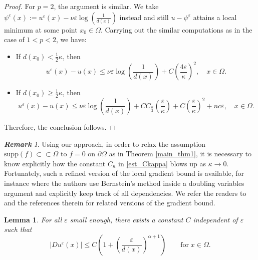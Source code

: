 \documentclass[12pt,reqno]{amsart}
\numberwithin{figure}{section}
\theoremstyle{plain}
\newtheorem{lem}[thm]{Lemma}
\theoremstyle{remark}
\newtheorem{rem}{\bf{Remark}}
\numberwithin{equation}{section}
\begin{document}
\begin{proof}
For $p = 2$, the argument is similar. We take $\psi^\varepsilon(x):=u^\varepsilon(x)-\nu \varepsilon \log \left(\frac{1}{d(x)}\right)$ instead and still $u-\psi^\varepsilon$ attains a local minimum at some point $x_0 \in \Omega$. Carrying out the similar computations as in the case of $1 < p < 2$, we have:
\begin{itemize}
    \item If $\displaystyle d(x_0) < \frac{1}{2} \kappa$, then
    \begin{equation*}
        u^\varepsilon(x)-u(x) \leq \nu \varepsilon \log \left( \frac{1}{d(x)} \right) + C\left( \frac{4\varepsilon}{\kappa}\right)^2, \quad x \in \Omega.
    \end{equation*}
    \item If $\displaystyle d(x_0) \geq \frac{1}{2} \kappa$, then
    \begin{equation*}
        u^\varepsilon(x)-u(x) \leq \nu \varepsilon \log\left(\frac{1}{d(x)}\right) + 
        C C_\frac{\kappa}{2} \left( \frac{\varepsilon}{\kappa} \right) + C \left( \frac{\varepsilon}{\kappa} \right)^2 + nc\varepsilon, \quad x \in \Omega.
    \end{equation*}
\end{itemize}
Therefore, the conclusion follows.
\end{proof}

\begin{rem} Using our approach, in order to relax the assumption $\mathrm{supp}(f)\subset\subset\Omega$ to $f = 0$ on $\partial\Omega$ as in Theorem \ref{main_thm1}, it is necessary to know explicitly how the constant $C_\kappa$ in \eqref{est_Ckappa} blows up as $\kappa\to 0$. Fortunately, such a refined version of the local gradient bound is available, for instance \cite[Theorem 3.1]{Armstrong2015} where the authors use Bernstein's method inside a doubling variables argument and explicitly keep track of all dependencies. We refer the readers to \cite{armstrong_stochastic_2012, barles_weak_1991,capuzzo_dolcetta_holder_2010} and the references therein for related versions of the gradient bound.
\end{rem}


\begin{lem}\label{lem:boundDu^eps} For all $\varepsilon$ small enough, there exists a constant $C$ independent of $\varepsilon$ such that
\begin{equation}\label{eq:es_final}
|Du^\varepsilon(x)| \leq C\left( 1 + \left(\frac{\varepsilon}{d(x)}\right)^{\alpha+1}\right) \qquad\text{for}\;x\in \Omega.
\end{equation}
\end{lem}
\end{document}

